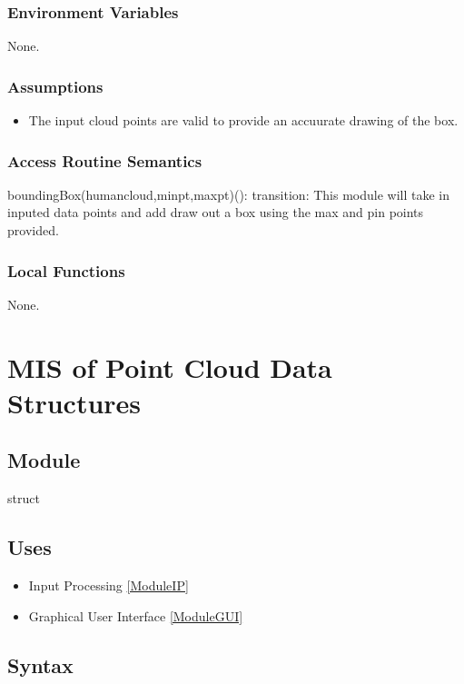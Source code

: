 \documentclass[12pt, titlepage]{article}
\begin{document}
\subsubsection{Environment Variables}

None.

\subsubsection{Assumptions}

\begin{itemize}
  \item The input cloud points are valid to provide an accuurate drawing of the box.
\end{itemize}

\subsubsection{Access Routine Semantics}

\noindent boundingBox(humancloud,minpt,maxpt)():
transition: This module will take in inputed data points and add draw out a box using the max and pin points provided.
\subsubsection{Local Functions}

None.
\newpage

\section{MIS of Point Cloud Data Structures} \label{ModulePCDS} 

\subsection{Module}

struct

\subsection{Uses}

\begin{itemize}
  \item Input Processing \ref{ModuleIP}
  \item Graphical User Interface \ref{ModuleGUI}
\end{itemize}

\subsection{Syntax}
\end{document}
